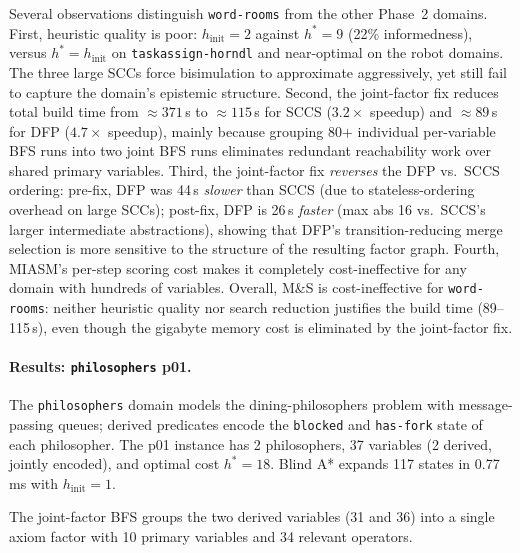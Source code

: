 \documentclass[11pt,a4paper]{article}
\begin{document}
    Several observations distinguish \texttt{word-rooms} from the other
    Phase~2 domains.  First, heuristic quality is poor: $h_{\mathrm{init}} = 2$
    against $h^* = 9$ (22\% informedness), versus $h^* = h_{\mathrm{init}}$
    on \texttt{taskassign-horndl} and near-optimal on the robot domains.
    The three large SCCs force bisimulation to approximate aggressively,
    yet still fail to capture the domain's epistemic structure.  Second,
    the joint-factor fix reduces total build time from $\approx 371$\,s to
    $\approx 115$\,s for SCCS ($3.2\times$ speedup) and $\approx 89$\,s for
    DFP ($4.7\times$ speedup), mainly because grouping 80$+$ individual
    per-variable BFS runs into two joint BFS runs eliminates redundant
    reachability work over shared primary variables.  Third, the joint-factor
    fix \emph{reverses} the DFP vs.\ SCCS ordering: pre-fix, DFP was 44\,s
    \emph{slower} than SCCS (due to stateless-ordering overhead on large SCCs);
    post-fix, DFP is 26\,s \emph{faster} (max abs 16 vs.\ SCCS's larger
    intermediate abstractions), showing that DFP's transition-reducing merge
    selection is more sensitive to the structure of the resulting factor graph.
    Fourth, MIASM's per-step scoring cost makes it completely
    cost-ineffective for any domain with hundreds of variables.
    Overall, M\&S is cost-ineffective for \texttt{word-rooms}: neither
    heuristic quality nor search reduction justifies the build time
    (89--115\,s), even though the gigabyte memory cost is eliminated by the
    joint-factor fix.

    \paragraph{Results: \texttt{philosophers} p01.}

    The \texttt{philosophers} domain models the dining-philosophers problem
    with message-passing queues; derived predicates encode the
    \texttt{blocked} and \texttt{has-fork} state of each philosopher.
    The p01 instance has 2 philosophers, 37 variables (2 derived, jointly
    encoded), and optimal cost $h^* = 18$.
    Blind A* expands 117 states in 0.77\,ms with $h_{\mathrm{init}} = 1$.

    The joint-factor BFS groups the two derived variables (31 and 36) into
    a single axiom factor with 10 primary variables and 34 relevant
    operators.
\end{document}

